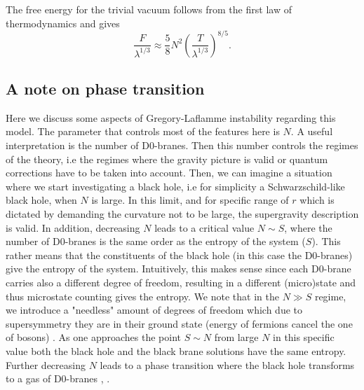 \documentclass[11pt,english]{article}
\newcommand{\be}{\begin{equation}}
\newcommand{\ee}{\end{equation}}
\numberwithin{equation}{section}
\begin{document}
  \noindent
  The free energy for the trivial vacuum follows from the first law of thermodynamics and gives 
  \be \label{freeE}
  \frac{F}{\lambda^{1/3}}\approx\frac{5}{8}N^2\left(\frac{T}{\lambda^{1/3}}\right)^{8/5}.
  \ee 
  
  
  \subsection{A note on phase transition}\label{transitionsection}
  Here we discuss some aspects of Gregory-Laflamme instability \cite{Gregory93} regarding this model.
  The parameter that controls most of the features here is  $N$. A useful interpretation is the number of D0-branes. Then this number controls the regimes of the theory, i.e the regimes where the gravity picture is valid or quantum corrections have to be taken into account. Then, we can imagine a situation where we start investigating a black hole, i.e for simplicity a Schwarzschild-like black hole,  when $N$ is large. In this limit, and for specific range of $r$ which is dictated by demanding the curvature not to be large, the supergravity description is valid. In addition, decreasing $N$ leads to a critical value $N\sim S$, where the number of D0-branes is the same order as the entropy of the system ($S$). This rather means that the constituents of the black hole (in this case the D0-branes) give the entropy of the system. Intuitively, this makes sense since each D0-brane carries also a different degree of freedom, resulting in a different (micro)state and thus microstate counting gives the entropy.   We note that in the $N\gg S$ regime, we introduce a "needless" amount of degrees of freedom which due to supersymmetry they are in their ground state (energy of fermions cancel the one of bosons) . As one approaches the point $S\sim N$  from large $N$ in this specific value both the black hole and the black brane solutions have the same entropy. Further decreasing $N$ leads to a phase transition where the black hole transforms to a gas of D0-branes \cite{HorowitzCorr}, \cite{Horowitz1997}.  
  
\end{document}
